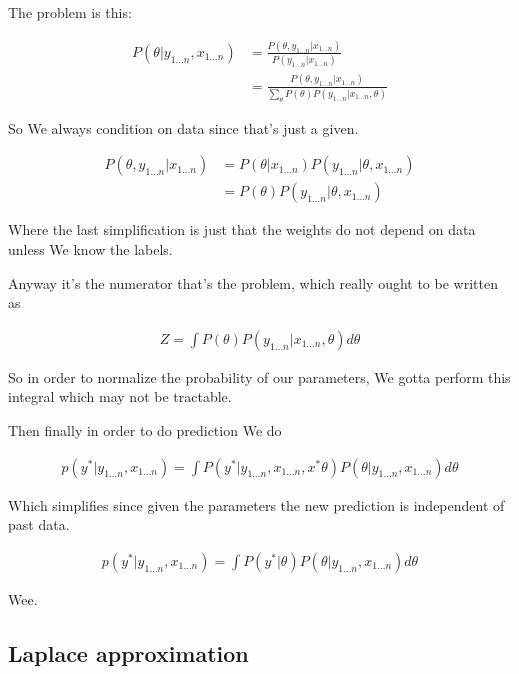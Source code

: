 \documentclass{article}
\begin{document}
		The problem is this:
		
		\begin{align}
			P(\theta|y_{1\ldots n}, x_{1\ldots n}) &= \frac{P(\theta, y_{1\ldots n}| x_{1\ldots n})}{P(y_{1\ldots n}| x_{1\ldots n})}\\
			&= \frac{P(\theta, y_{1\ldots n}| x_{1\ldots n})}{\sum_\theta P(\theta)P(y_{1\ldots n}| x_{1\ldots n },\theta)}
		\end{align}
		
		So We always condition on data since that's just a given.
		
		\begin{align}
			P(\theta, y_{1\ldots n}| x_{1\ldots n}) &= P(\theta | x_{1\ldots n})P(y_{1\ldots n}|\theta, x_{1\ldots n})\\
			&= P(\theta)P(y_{1\ldots n}|\theta, x_{1\ldots n})
		\end{align}
		
		Where the last simplification is just that the weights do not depend on data unless We know the labels. 
		
		Anyway it's the numerator that's the problem, which really ought to be written as
		
		\begin{align}
			Z = \int P(\theta)P(y_{1 \ldots n}|x_{1\ldots n}, \theta) d\theta
		\end{align}
		
		So in order to normalize the probability of our parameters, We gotta perform this integral which may not be tractable.
		
		Then finally in order to do prediction We do
		
		\begin{align}
			p(y^*|y_{1\ldots n}, x_{1\ldots n}) = \int P(y^*|y_{1\ldots n}, x_{1\ldots n}, x^* \theta) P(\theta|y_{1\ldots n}, x_{1\ldots n}) d\theta
		\end{align}
		
		Which simplifies since given the parameters the new prediction is independent of past data.
		
		\begin{align}
			p(y^*|y_{1\ldots n}, x_{1\ldots n}) = \int P(y^*| \theta) P(\theta|y_{1\ldots n}, x_{1\ldots n}) d\theta
		\end{align}
		
		Wee.
		
	\subsection{Laplace approximation}
	
\end{document}
